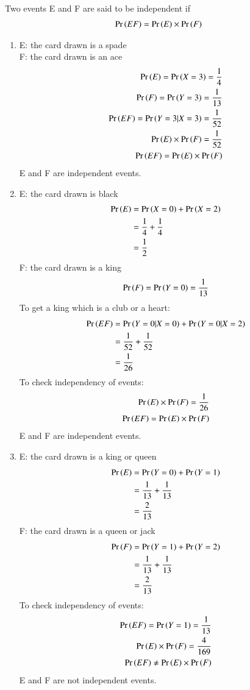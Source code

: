 \documentclass[journal,12pt,twocolumn]{IEEEtran}
\begin{document}
Two events E and F are said to be independent if
\begin{align}
    \Pr\left(EF\right) = \Pr\left(E\right) \times \Pr\left(F\right)
\end{align}

\begin{enumerate}
    \item E: the card drawn is a spade\\
	F: the card drawn is an ace
    \begin{align}
    \Pr\left(E\right) = \Pr\left(X=3\right) = \frac{1}{4}\\
    \Pr\left(F\right) = \Pr\left(Y=3\right) = \frac{1}{13}\\
    \Pr\left(EF\right) = \Pr\left(Y=3|X=3\right) = \frac{1}{52}\\
    \Pr\left(E\right) \times \Pr\left(F\right) = \frac{1}{52}\\
    \Pr\left(EF\right) = \Pr\left(E\right) \times \Pr\left(F\right)
    \end{align}
    E and F are independent events.\\
	\item E: the card drawn is black
	\begin{align}
    \Pr\left(E\right) &= \Pr\left(X=0\right) + \Pr\left(X=2\right)\\
    &= \frac{1}{4} + \frac{1}{4}\\ &= \frac{1}{2}
    \end{align}
    F: the card drawn is a king
    \begin{align}
       \Pr\left(F\right) = \Pr\left(Y=0\right) = \frac{1}{13}
    \end{align}
    To get a king which is a club or a heart:
    \begin{align}
    \Pr\left(EF\right) &= \Pr\left(Y=0|X=0\right) + \Pr\left(Y=0|X=2\right)\\
    &= \frac{1}{52} + \frac{1}{52}\\
    &= \frac{1}{26}
    \end{align}
   To check independency of events:
    \begin{align}
        \Pr\left(E\right) \times \Pr\left(F\right) = \frac{1}{26}\\
        \Pr\left(EF\right) = \Pr\left(E\right) \times \Pr\left(F\right)
    \end{align}
    E and F are independent events.\\
    \item E: the card drawn is a king or queen
    \begin{align}
	    \Pr\left(E\right) &= \Pr\left(Y=0\right) + \Pr\left(Y=1\right)\\
	    &= \frac{1}{13} + \frac{1}{13}\\
	    &= \frac{2}{13}
	\end{align}
	F: the card drawn is a queen or jack
	\begin{align}
	    \Pr\left(F\right) &= \Pr\left(Y=1\right) + \Pr\left(Y=2\right)\\
	    &= \frac{1}{13} + \frac{1}{13}\\
	    &= \frac{2}{13}
	\end{align}
	To check independency of events:
	\begin{align}
	    \Pr\left(EF\right) = \Pr\left(Y=1\right) = \frac{1}{13}\\
	    \Pr\left(E\right) \times \Pr\left(F\right) = \frac{4}{169}\\
	    \Pr\left(EF\right) \neq \Pr\left(E\right) \times \Pr\left(F\right)
	\end{align}
	E and F are not independent events.
\end{enumerate}
\end{document}
